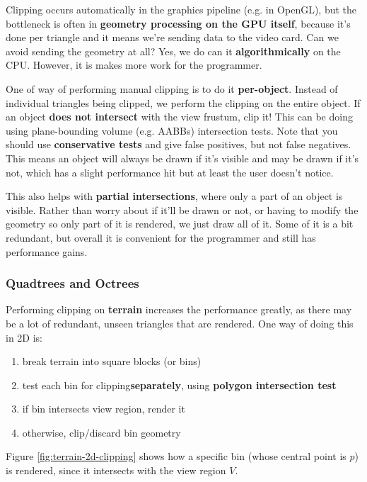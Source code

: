 \documentclass{article}
\begin{document}
Clipping occurs automatically in the graphics pipeline (e.g. in OpenGL), but the bottleneck is often in \textbf{geometry processing on the GPU itself}, because it's done per triangle and it means we're sending data to the video card. Can we avoid sending the geometry at all? Yes, we do can it \textbf{algorithmically} on the CPU. However, it is makes more work for the programmer.

One of way of performing manual clipping is to do it \textbf{per-object}. Instead of individual triangles being clipped, we perform the clipping on the entire object. If an object \textbf{does not intersect} with the view frustum, clip it! This can be doing using plane-bounding volume (e.g. AABBs) intersection tests. Note that you should use \textbf{conservative tests} and give false positives, but not false negatives. This means an object will always be drawn if it's visible and may be drawn if it's not, which has a slight performance hit but at least the user doesn't notice.

This also helps with \textbf{partial intersections}, where only a part of an object is visible. Rather than worry about if it'll be drawn or not, or having to modify the geometry so only part of it is rendered, we just draw all of it. Some of it is a bit redundant, but overall it is convenient for the programmer and still has performance gains.

\subsubsection{Quadtrees and Octrees}

Performing clipping on \textbf{terrain} increases the performance greatly, as there may be a lot of redundant, unseen triangles that are rendered. One way of doing this in 2D is:
\begin{enumerate}
	\item break terrain into square blocks (or bins)
	\item test each bin for clipping\textbf{separately}, using \textbf{polygon intersection test}
	\item if bin intersects view region, render it
	\item otherwise, clip/discard bin geometry
\end{enumerate}
Figure \ref{fig:terrain-2d-clipping} shows how a specific bin (whose central point is $p$) is rendered, since it intersects with the view region $V$.
\end{document}

